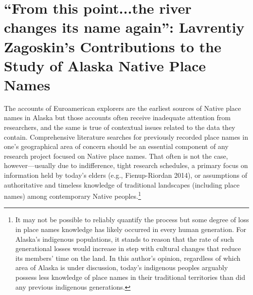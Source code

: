 \chapter[Lavrentiy Zagoskin’s Contributions to the Study of Alaska Native Place Names]{\vspace{-25pt}“From this point...the river changes its name again”: Lavrentiy Zagoskin’s Contributions to the Study of Alaska Native Place Names}



\def\authorlast{Pratt}


\renewcommand{\beginchapter}{\pageref{pratt-ch-begin}}
\renewcommand{\finishchapter}{\pageref{pratt-ch-end}}
\label{pratt-ch-begin}



\thispagestyle{firststyle}



The accounts of Euroamerican explorers are the earliest sources of Native place names in Alaska but those accounts often receive inadequate attention from researchers, and the same is true of contextual issues related to the data they contain. Comprehensive literature searches for previously recorded place names in one’s geographical area of concern should be an essential component of any research project focused on Native place names. That often is not the case, however---usually due to indifference, tight research schedules, a primary focus on information held by today’s elders (e.g., Fienup-Riordan 2014), or assumptions of authoritative and timeless knowledge of traditional landscapes (including place names) among contemporary Native peoples.\footnote{It may not be possible to reliably quantify the process but some degree of loss in place names knowledge has likely occurred in every human generation. For Alaska’s indigenous populations, it stands to reason that the rate of such generational losses would increase in step with cultural changes that reduce its members’ time on the land. In this author’s opinion, regardless of which area of Alaska is under discussion, today’s indigenous peoples arguably possess less knowledge of place names in their traditional territories than did any previous indigenous generations.}

